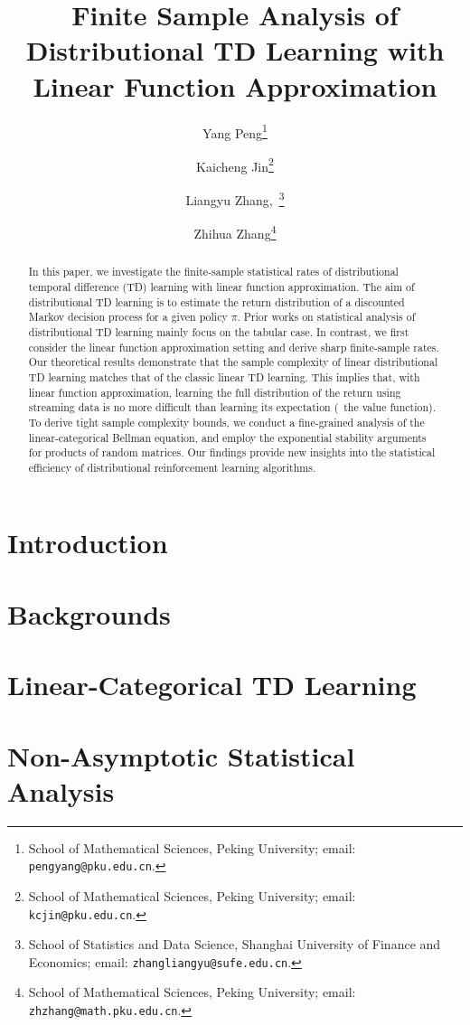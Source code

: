 \documentclass[11pt]{article}
\title{Finite Sample Analysis of Distributional TD Learning with Linear Function Approximation}
\author{
Yang Peng\thanks{School of Mathematical Sciences, Peking University; email: \texttt{pengyang@pku.edu.cn}.} \and
Kaicheng Jin\thanks{School of Mathematical Sciences, Peking University; email: \texttt{kcjin@pku.edu.cn}.} \and
Liangyu Zhang,~\thanks{School of Statistics and Data Science, Shanghai University of Finance and Economics; email: \texttt{zhangliangyu@sufe.edu.cn}.} \and
Zhihua Zhang\thanks{School of Mathematical Sciences, Peking University; email: \texttt{zhzhang@math.pku.edu.cn}.}
}
\begin{document}
\maketitle
\begin{abstract}%
In this paper, we investigate the finite-sample statistical rates of distributional temporal difference (TD) learning with linear function approximation.
The aim of distributional TD learning is to estimate the return distribution of a discounted Markov decision process for a given policy $\pi$.
Prior works on statistical analysis of distributional TD learning mainly focus on the tabular case.
In contrast, we first consider the linear function approximation setting and derive sharp finite-sample rates.
Our theoretical results demonstrate that the sample complexity of linear distributional TD learning matches that of the classic linear TD learning.
This implies that, with linear function approximation, learning the full distribution of the return using streaming data is no more difficult than learning its expectation (\ie\ the value function).
To derive tight sample complexity bounds, we conduct a fine-grained analysis of the linear-categorical Bellman equation, and employ the exponential stability arguments for products of random matrices.
Our findings provide new insights into the statistical efficiency of distributional reinforcement learning algorithms.
\end{abstract}
\tableofcontents
\section{Introduction}\label{Section:intro}

% 
\section{Backgrounds}\label{Section:background}

\section{Linear-Categorical TD Learning}\label{Section:linear_ctd}

\section{Non-Asymptotic Statistical Analysis}\label{Section:analysis_linear_ctd}

\end{document}
